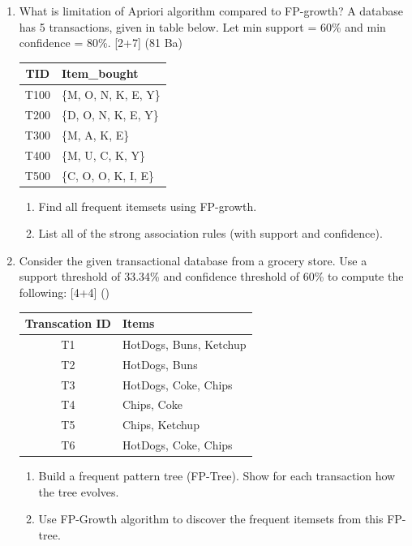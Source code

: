 \documentclass[12pt]{article}
\begin{document}
\begin{enumerate}[topsep=0pt, noitemsep]
      \item What is limitation of Apriori algorithm compared to FP-growth? A database has 5 transactions, given in table below. Let min support = 60\% and min confidence = 80\%. \hfill [2+7] (81 Ba)\\
        \small
        \begin{tabular}{|c|l|}
          \hline
          TID & Item\_bought \\ \hline
          T100 & \{M, O, N, K, E, Y\} \\ \hline
          T200 & \{D, O, N, K, E, Y\} \\ \hline
          T300 & \{M, A, K, E\} \\ \hline
          T400 & \{M, U, C, K, Y\} \\ \hline
          T500 & \{C, O, O, K, I, E\} \\ \hline
        \end{tabular}
        \normalsize
        \begin{enumerate}[label=\roman*),topsep=2pt,noitemsep]
          \item Find all frequent itemsets using FP-growth.
          \item List all of the strong association rules (with support and confidence).
        \end{enumerate}

      \item Consider the given transactional database from a grocery store. Use a support threshold of 33.34\% and confidence threshold of 60\% to compute the following: \hfill [4+4] ()\\
        \small
        \begin{tabular}{|c|l|}
          \hline
          Transcation ID & Items \\ \hline
          T1 & HotDogs, Buns, Ketchup \\ \hline
          T2 & HotDogs, Buns \\ \hline
          T3 & HotDogs, Coke, Chips \\ \hline
          T4 & Chips, Coke \\ \hline
          T5 & Chips, Ketchup \\ \hline
          T6 & HotDogs, Coke, Chips \\ \hline
        \end{tabular}
        \normalsize
        \begin{enumerate}[label=\alph*),topsep=2pt,noitemsep]
          \item Build a frequent pattern tree (FP-Tree). Show for each transaction how the tree evolves.
          \item Use FP-Growth algorithm to discover the frequent itemsets from this FP-tree.
        \end{enumerate}


\end{enumerate}
\end{document}
